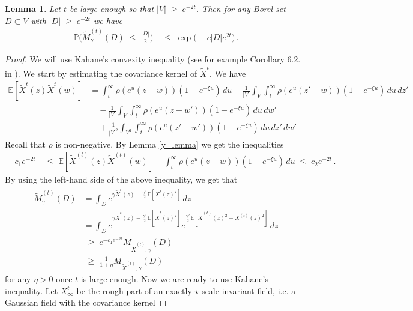 \documentclass[11pt]{article}
\numberwithin{equation}{section}
\newcounter{exa}
\newtheorem{lemma}[theorem]{Lemma}
\theoremstyle{definition}
\renewcommand{\tilde}{\widetilde}          %
\renewcommand{\leq}{\;\leqslant\;}                   %
\renewcommand{\geq}{\;\geqslant\;}                   %
\newcommand{\E}{\mathbb{E}}
\renewcommand{\P}{\mathbb{P}}
\newcommand{\ab}{|}
\newcommand{\grea}{>}
\begin{document}
\begin{lemma}\label{concentration}
Let $t$ be large enough so that $\ab V \ab \geq e^{-2t}$. Then for any Borel set $D \subset V$ with $\ab D \ab \geq e^{-2t}$ we have 
\begin{align*}
\P\big( \tilde M_{\gamma}^{(t)}(D) \leq \tfrac{\ab D \ab}{2} \big) &\leq  \exp \big( - c \ab D \ab e^{2t} \big)\,.
\end{align*}
\end{lemma}

\begin{proof} 
We will use Kahane's convexity inequality (see for example Corollary 6.2. in \cite{RoVa}). We start by estimating the covariance kernel of $\tilde X^{t}$. We have
\begin{align*}
\E[ \tilde X^{t}(z) \tilde X^{t}(w)] &= \int_t^\infty \rho(e^u ( z-w ))(1-e^{-\xi u}) \, du - \frac{1}{\ab V \ab} \int_V \int_t^\infty \rho(e^u ( z'-w ))(1-e^{-\xi u}) \, du \, dz' \\
& \quad -  \frac{1}{\ab V \ab} \int_V \int_t^\infty \rho(e^u ( z-w' ))(1-e^{-\xi u}) \, du \, dw' \\
& \quad + \frac{1}{\ab V \ab^2} \int_{V^2}  \int_t^\infty \rho(e^u ( z'-w' ))(1-e^{-\xi u}) \, du \, dz' \, dw' 
\end{align*}
Recall that $\rho$ is non-negative. By Lemma \ref{y_lemma} we get the inequalities
\begin{align}\label{eq_tilde_X_cov}
 - c_1 e^{-2t} &\leq  \E[\tilde X^{(t)}(z) \tilde X^{(t)}(w)] - \int_t^\infty \rho(e^u ( z-w ) )(1-e^{-\xi u}) \, du \leq   c_2 e^{-2t}\,.
\end{align}
By using the left-hand side of the above inequality, we get that 
\begin{align}\label{eq_eta}
\tilde M_\gamma^{(t)}(D) &= \int_D e^{\gamma \tilde X^t(z) - \frac{\gamma^2}{2} \E[X^{t} (z)^2]} \, dz  \nonumber \\
&= \int_D e^{\gamma \tilde X^t(z) - \frac{\gamma^2}{2} \E[\tilde{X}^{t} (z)^2]} e^{\frac{\gamma^2}{2} \E[ \tilde{X}^{(t)}(z)^2 - X^{(t)}(z)^2 ]} \, dz \nonumber \\
& \geq e^{-c_1  e^{-2t} } M_{\tilde X^{(t)},\gamma}(D) \nonumber \\
&\geq \frac{1}{1+ \eta}  M_{\tilde X^{(t)},\gamma}(D)
\end{align}
for any $\eta \grea 0$ once $t$ is large enough. Now we are ready to use Kahane's inequality. Let $X_\infty^t$ be the rough part of an exactly $\star$-scale invariant field, i.e. a Gaussian field with the covariance kernel

\end{proof}
\end{document}

